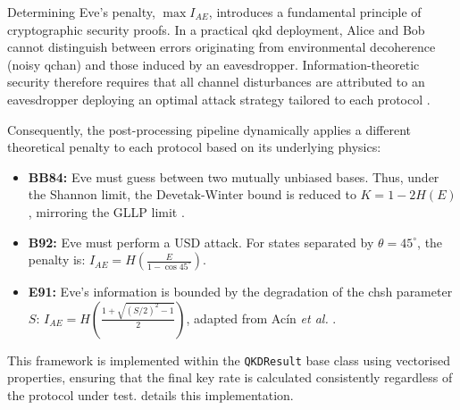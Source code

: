 Determining Eve's penalty, $\max I_{AE}$, introduces a fundamental principle of cryptographic security proofs. In a practical \gls{qkd} deployment, Alice and Bob cannot distinguish between errors originating from environmental decoherence (noisy \gls{qchan}) and those induced by an eavesdropper. Information-theoretic security therefore requires that all channel disturbances are attributed to an eavesdropper deploying an optimal attack strategy tailored to each protocol \cite{DWbound2005}. 

Consequently, the post-processing pipeline dynamically applies a different theoretical penalty to each protocol based on its underlying physics: 

\begin{itemize}
    \item \textbf{BB84:} Eve must guess between two mutually unbiased bases. Thus, under the Shannon limit, the Devetak-Winter bound is reduced to $K = 1 - 2H(E)$, mirroring the GLLP limit \cite{GLLP2004}.
    \item \textbf{B92:} Eve must perform a USD attack. For states separated by $\theta = 45^\circ$, the penalty is: $I_{AE} = H\left(\frac{E}{1 - \cos 45^\circ}\right)$.
    \item \textbf{E91:} Eve's information is bounded by the degradation of the \gls{chsh} parameter $S$: $I_{AE} = H\left(\frac{1 + \sqrt{(S/2)^2 - 1}}{2}\right)$, adapted from Acín \textit{et al.} \cite{Acin2007}.
\end{itemize} 

This framework is implemented within the \texttt{QKDResult} base class using vectorised properties, ensuring that the final key rate is calculated consistently regardless of the protocol under test.  details this implementation.

